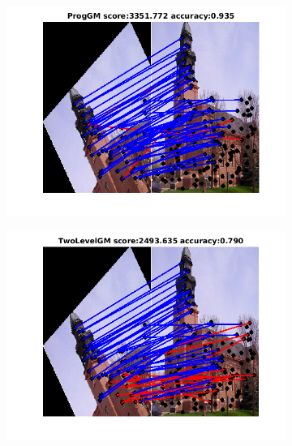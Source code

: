 \documentclass[
	fontsize=12pt,
	paper=a4,
	twoside=false,
	numbers=noenddot,
	plainheadsepline,
	toc=listof,
	toc=bibliography
]{scrartcl}
\begin{document}
\begin{figure}[h]
	\begin{subfigure}[b]{0.3\textwidth}
		\centering
		\includegraphics[scale=0.4]{"fig_ver2608/RealImages/Img_trafo/no_descr/using_cdf_afftrafo/fi_5_ProgGM"} 
	\end{subfigure}%
	\begin{subfigure}[b]{0.3\textwidth}
		\centering
		\includegraphics[scale=0.4]{"fig_ver2608/RealImages/Img_trafo/no_descr/using_cdf_afftrafo/fi_5_2lGM"} 
	\end{subfigure} 
	\begin{subfigure}[b]{0.3\textwidth}
		\centering

\end{subfigure}
\end{figure}
\end{document}

